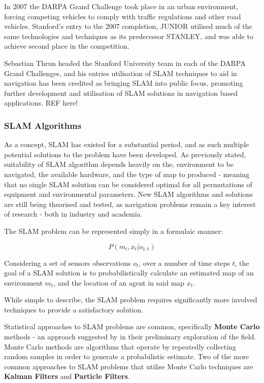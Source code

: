 In 2007 the DARPA Grand Challenge took place in an urban environment, forcing
competing vehicles to comply with traffic regulations and other road vehicles.
Stanford's entry to the 2007 completion, JUNIOR utilised much of the same
technologies and techniques as its predecessor STANLEY, and was able to achieve
second place in the competition.

Sebastian Thrun headed the Stanford University team in each of the DARPA Grand
Challenges, and his entries utilisation of SLAM techniques to aid in
navigation has been credited as bringing SLAM into public focus, promoting
further development and utilisation of SLAM solutions in navigation based
applications. REF here!

\subsubsection{SLAM Algorithms}
As a concept, SLAM has existed for a substantial period, and as such multiple
potential solutions to the problem have been developed.
As previously stated, suitability of SLAM algorithm depends heavily on the,
environment to be navigated, the available hardware, and the type of map to
produced - meaning that no single SLAM solution can be considered optimal for
all permutations of equipment and environmental parameters.
New SLAM algorithms and solutions are still being theorised and tested, as
navigation problems remain a key interest of research - both in industry and
academia.

The SLAM problem can be represented simply in a formulaic manner:

\[ P(m_t,x_t|o_{1:t}) \]

Considering a set of sensors observations \(o_t \), over a number of time
steps \(t\), the goal of a SLAM solution is to probabilistically calculate an
estimated map of an environment \(m_t\), and the location of an agent in said
map \(x_t\).

While simple to describe, the SLAM problem requires significantly more
involved techniques to provide a satisfactory solution.

Statistical approaches to SLAM problems are common, specifically {\bf Monte
Carlo} methods - an approach suggested by \citeauthor{Smith1986} in their
preliminary exploration of the field.
Monte Carlo methods are algorithms that operate by repeatedly collecting
random samples in order to generate a probabilistic estimate.
Two of the more common approaches to SLAM problems that utilise Monte Carlo
techniques are {\bf Kalman Filters} and {\bf Particle Filters}.

